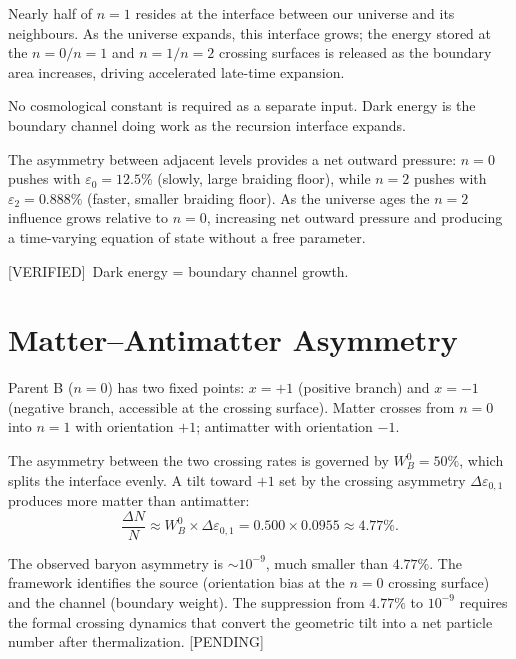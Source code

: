 \documentclass[prd,twocolumn,preprintnumbers,amsmath,amssymb]{revtex4-2}
\newcommand{\verified}{\textcolor{green!60!black}{[VERIFIED]}}
\newcommand{\pending}{\textcolor{red!70!black}{[PENDING]}}
\begin{document}
Nearly half of $n=1$ resides at the interface between our universe
and its neighbours.  As the universe expands, this interface grows;
the energy stored at the $n=0/n=1$ and $n=1/n=2$ crossing surfaces
is released as the boundary area increases, driving accelerated
late-time expansion.

No cosmological constant is required as a separate input.  Dark
energy is the boundary channel doing work as the recursion interface
expands.

The asymmetry between adjacent levels provides a net outward pressure:
$n=0$ pushes with $\varepsilon_0 = 12.5\%$ (slowly, large braiding
floor), while $n=2$ pushes with $\varepsilon_2 = 0.888\%$ (faster,
smaller braiding floor).  As the universe ages the $n=2$ influence
grows relative to $n=0$, increasing net outward pressure and producing
a time-varying equation of state without a free parameter.

\verified\ Dark energy = boundary channel growth.

\section{Matter--Antimatter Asymmetry}
\label{sec:baryogen}

Parent B ($n=0$) has two fixed points: $x=+1$ (positive branch) and
$x=-1$ (negative branch, accessible at the crossing surface).  Matter
crosses from $n=0$ into $n=1$ with orientation $+1$; antimatter with
orientation $-1$.

The asymmetry between the two crossing rates is governed by $W_B^0 = 50\%$,
which splits the interface evenly.  A tilt toward $+1$ set by the
crossing asymmetry $\Delta\varepsilon_{0,1}$ produces more matter than
antimatter:
\begin{equation}
  \frac{\Delta N}{N}
    \approx W_B^0 \times \Delta\varepsilon_{0,1}
    = 0.500 \times 0.0955
    \approx 4.77\%.
  \label{eq:baryonasym}
\end{equation}

The observed baryon asymmetry is $\sim 10^{-9}$, much smaller than
$4.77\%$.  The framework identifies the source (orientation bias at
the $n=0$ crossing surface) and the channel (boundary weight).  The
suppression from $4.77\%$ to $10^{-9}$ requires the formal crossing
dynamics that convert the geometric tilt into a net particle number
after thermalization.  \pending
\end{document}
